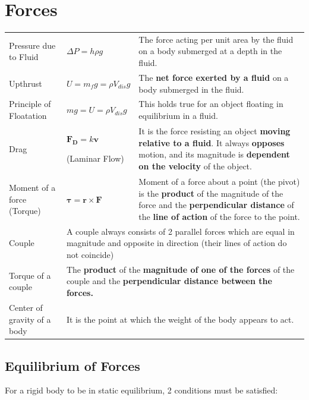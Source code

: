 \documentclass[a4paper,11pt]{article}
\begin{document}
	\section{Forces}
		\begin{center}
			\renewcommand{\arraystretch}{1.2}
			\begin{tabular}{@{} l l p{7cm} @{}}
				\toprule
				Pressure due to Fluid & $\Delta P = h\rho g$ & The force acting per unit area by the fluid on a body submerged at a depth in the fluid. \\
				Upthrust & $U=m_{f}g=\rho V_{dis}g$ & The \textbf{net force exerted by a fluid} on a body submerged in the fluid. \\
				Principle of Floatation & $mg=U=\rho V_{dis} g$ & This holds true for an object floating in equilibrium in a fluid.  \\
				Drag & \multicolumn{1}{p{2.5cm}}{$\textbf{F}_{\textbf{D}}=k\textbf{v}$ \par (Laminar Flow)} & It is the force resisting an object \textbf{moving relative to a fluid}. It always \textbf{opposes} motion, and its magnitude is \textbf{dependent on the velocity} of the object.\\
				\midrule
				Moment of a force (Torque) & $\boldsymbol{\tau}=\textbf{r} \times \textbf{F}$ & Moment of a force about a point (the pivot) is the \textbf{product} of the magnitude of the force and the \textbf{perpendicular distance} of the \textbf{line of action} of the force to the point. \\
				Couple & \multicolumn{2}{p{10.3cm}}{A couple always consists of 2 parallel forces which are equal in magnitude and opposite in direction (their lines of action do not coincide)} \\
				Torque of a couple & \multicolumn{2}{p{10.3cm}}{The \textbf{product} of the \textbf{magnitude of one of the forces} of the couple and the \textbf{perpendicular distance between the forces.}} \\
				Center of gravity of a body & \multicolumn{2}{l}{It is the point at which the weight of the body appears to act.} \\
				\bottomrule
			\end{tabular}
		\end{center}
		\subsection{Equilibrium of Forces}
			For a rigid body to be in static equilibrium, 2 conditions must be satisfied:
			
\end{document}
